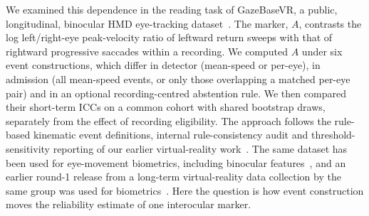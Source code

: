 We examined this dependence in the reading task of GazeBaseVR, a public, longitudinal, binocular HMD eye-tracking dataset~\citep{lohr2023}. The marker, $A$, contrasts the log left/right-eye peak-velocity ratio of leftward return sweeps with that of rightward progressive saccades within a recording. We computed $A$ under six event constructions, which differ in detector (mean-speed or per-eye), in admission (all mean-speed events, or only those overlapping a matched per-eye pair) and in an optional recording-centred abstention rule. We then compared their short-term ICCs on a common cohort with shared bootstrap draws, separately from the effect of recording eligibility. The approach follows the rule-based kinematic event definitions, internal rule-consistency audit and threshold-sensitivity reporting of our earlier virtual-reality work~\citep{vrst26}. The same dataset has been used for eye-movement biometrics, including binocular features~\citep{raju2024,yao2026}, and an earlier round-1 release from a long-term virtual-reality data collection by the same group was used for biometrics~\citep{lohr2020}. Here the question is how event construction moves the reliability estimate of one interocular marker.

